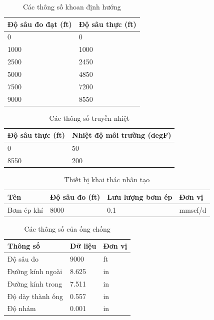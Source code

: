 \documentclass[12pt,a4paper]{report}
\begin{document}
\begin{table}[h]
\caption{Các thông số khoan định hướng}\label{tab:wellbore_data}
\begin{tabularx}{\textwidth}{@{}XX@{}}
\toprule
Độ sâu đo đạt (ft) & Độ sâu thực (ft) \\ \midrule
0       & 0        \\
1000    & 1000     \\
2500    & 2450     \\
5000    & 4850     \\
7500    & 7200     \\
9000    & 8550     \\ \bottomrule
\end{tabularx}
\end{table}

\begin{table}[h]
\caption{Các thông số truyền nhiệt}\label{tab:heat_transfer}
\begin{tabularx}{\textwidth}{@{}XX@{}}
\toprule
Độ sâu thực (ft) & Nhiệt độ môi trường (degF) \\ \midrule
0                & 50                         \\
8550             & 200                        \\ \bottomrule
\end{tabularx}
\end{table}

\begin{table}[h]
\caption{Thiết bị khai thác nhân tạo}\label{tab:gaslift_valve}
\begin{tabularx}{\textwidth}{@{}XXXX@{}}
\toprule
Tên        & Độ sâu đo (ft) & Lưu lượng bơm ép & Đơn vị  \\ \midrule
Bơm ép khí & 8000           & 0.1              & mmscf/d \\ \bottomrule
\end{tabularx}
\end{table}

\begin{table}[h]
\caption{Các thông số của ống chống}\label{tab:casing_data}
\begin{tabularx}{\textwidth}{@{}XXX@{}}
\toprule
Thông số         & Dữ liệu & Đơn vị \\ \midrule
Độ sâu đo        & 9000    & ft     \\
Đường kính ngoài & 8.625   & in     \\
Đường kính trong & 7.511   & in     \\
Độ dày thành ống & 0.557   & in     \\
Độ nhám          & 0.001   & in     \\ \bottomrule
\end{tabularx}
\end{table}
\end{document}
